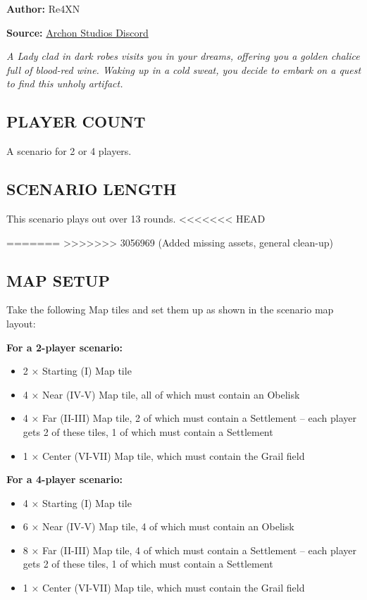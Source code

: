 
\begin{multicols*}{2}

\textbf{Author:} Re4XN

\textbf{Source:} \href{https://discord.com/channels/740870068178649108/1239631918643941509}{Archon Studios Discord}

\textit{A Lady clad in dark robes visits you in your dreams, offering you a golden chalice full of blood-red wine. Waking up in a cold sweat, you decide to embark on a quest to find this unholy artifact.}

\subsection*{\MakeUppercase{Player Count}}
A scenario for 2 or 4 players.

\subsection*{\MakeUppercase{Scenario Length}}
This scenario plays out over 13 rounds.
<<<<<<< HEAD

=======
>>>>>>> 3056969 (Added missing assets, general clean-up)
\subsection*{\MakeUppercase{Map Setup}}
Take the following Map tiles and set them up as shown in the scenario map layout:

\textbf{For a 2-player scenario:}
\begin{itemize}
    \item 2 × Starting (I) Map tile
    \item 4 × Near (IV-V) Map tile, all of which must contain an Obelisk
    \item 4 × Far (II-III) Map tile, 2 of which must contain a Settlement – each player gets 2 of these tiles, 1 of which must contain a Settlement
    \item 1 × Center (VI-VII) Map tile, which must contain the Grail field
\end{itemize}

\textbf{For a 4-player scenario:}
\begin{itemize}
    \item 4 × Starting (I) Map tile
    \item 6 × Near (IV-V) Map tile, 4 of which must contain an Obelisk
    \item 8 × Far (II-III) Map tile, 4 of which must contain a Settlement – each player gets 2 of these tiles, 1 of which must contain a Settlement
    \item 1 × Center (VI-VII) Map tile, which must contain the Grail field
\end{itemize}


\end{multicols*}
